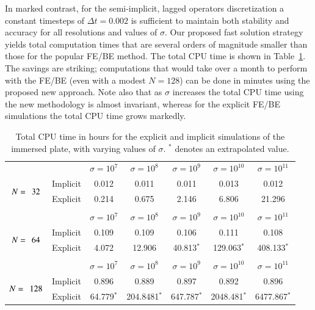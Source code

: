 \documentclass[preprint,12pt]{elsarticle}
\newcommand{\TableTopSpace}{\rule{0cm}{2.625ex}}
\begin{document}
In marked contrast, for the semi-implicit, lagged operators discretization a constant timesteps of $\Delta t = 0.002$ is sufficient to maintain
both stability and accuracy for all resolutions and values of $\sigma$.  Our proposed fast solution strategy yields total computation times that
are several orders of magnitude smaller than those for the popular FE/BE method. The total CPU time is shown in Table~\ref{table:SimulationTime_Plate}.
The savings are striking; computations that would take over a month to perform with the FE/BE (even with a modest $N=128$) can be done in minutes using the proposed new approach. Note also that  as $\sigma$ increases the total CPU time using the new methodology is almost invariant, whereas for the explicit FE/BE simulations the total CPU time grows markedly. 
\begin{table}
\caption{Total CPU time in hours for the explicit and implicit simulations of the immersed plate, with varying values of $\sigma$. $^*$ denotes an extrapolated value.}
\label{table:SimulationTime_Plate}
\begin{center}

\begin{tabular}{c c c c c c c}
  &  & $\sigma=10^7$ & $\sigma=10^8$ & $\sigma=10^9$ & $\sigma=10^{10}$ & $\sigma=10^{11}$ \\
\cline{3-7}
\multirow{2}{*}{$N=\hspace{1ex} 32$}
& \multicolumn{1}{c|}{Implicit} & \TableTopSpace
   0.012 & 0.011 & 0.011 & 0.013 & 0.012 \\
& \multicolumn{1}{c|}{Explicit} & \TableTopSpace
   0.214 & 0.675 & 2.146 & 6.806 & 21.296 \\
\vspace{.15 cm}
\\
  &  & $\sigma=10^7$ & $\sigma=10^8$ & $\sigma=10^9$ & $\sigma=10^{10}$ & $\sigma=10^{11}$ \\
\cline{3-7}
\multirow{2}{*}{$N=\hspace{1ex} 64$}
& \multicolumn{1}{c|}{Implicit} & \TableTopSpace
   0.109 & 0.109 & 0.106 & 0.111 & 0.108 \\
& \multicolumn{1}{c|}{Explicit} & \TableTopSpace
   4.072 & 12.906 & 40.813$^*$ & 129.063$^*$ & 408.133$^*$ \\
\vspace{.15 cm}
\\
  &  & $\sigma=10^7$ & $\sigma=10^8$ & $\sigma=10^9$ & $\sigma=10^{10}$ & $\sigma=10^{11}$ \\
\cline{3-7}
\multirow{2}{*}{$N=\hspace{1ex} 128$}
& \multicolumn{1}{c|}{Implicit} & \TableTopSpace
   0.896 & 0.889 & 0.897 & 0.892 & 0.896 \\
& \multicolumn{1}{c|}{Explicit} & \TableTopSpace
   64.779$^*$ & 204.8481$^*$ & 647.787$^*$ & 2048.481$^*$ & 6477.867$^*$ \\
\end{tabular}
   
\end{center}
\end{table}
\end{document}
